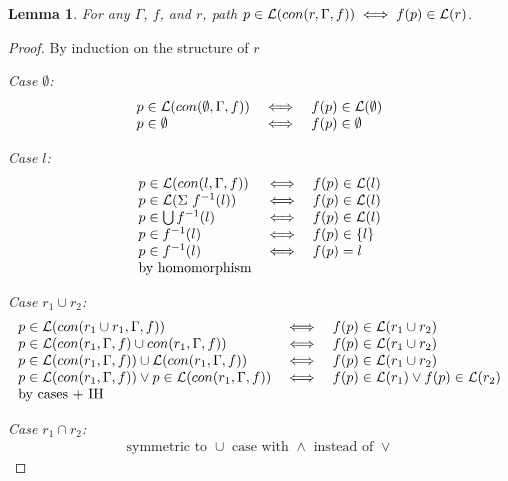 \documentclass[twocolumn, openany]{sig-alternate-10pt}
\newtheorem{lem}[thm]{Lemma}
\begin{document}
\vspace{1em}
\begin{lem}
  For any $\Gamma$, $f$, and $r$, path $p \in \mathcal{L}(con(r,\Gamma,f)) \iff f(p) \in \mathcal{L}(r)$.
\end{lem}
\begin{proof}
By induction on the structure of $r$

\emph{Case $\emptyset$:}
  \[ \begin{array}{lll}
    p \in \mathcal{L}(con(\emptyset,\Gamma,f)) &\iff& f(p) \in \mathcal{L}(\emptyset) \\
    p \in \emptyset &\iff& f(p) \in \emptyset \\
  \end{array} \]

\emph{Case $l$:}
  \[ \begin{array}{lll}
    p \in \mathcal{L}(con(l,\Gamma,f)) &\iff& f(p) \in \mathcal{L}(l) \\
    p \in \mathcal{L}(\Sigma ~ f^{-1}(l)) &\iff& f(p) \in \mathcal{L}(l) \\
    p \in \bigcup f^{-1}(l) &\iff& f(p) \in \mathcal{L}(l) \\
    p \in f^{-1}(l) &\iff& f(p) \in \{ l \} \\
    p \in f^{-1}(l) &\iff& f(p) = l \\
    \text{by homomorphism} & & \\
  \end{array} \]

\emph{Case $r_1 \cup r_2$:}
  \[ \begin{array}{lll}
    p \in \mathcal{L}(con(r_1 \cup r_1,\Gamma,f)) &\iff& f(p) \in \mathcal{L}(r_1 \cup r_2) \\
    p \in \mathcal{L}(con(r_1,\Gamma,f) \cup con(r_1,\Gamma,f)) &\iff& f(p) \in \mathcal{L}(r_1 \cup r_2) \\
    p \in \mathcal{L}(con(r_1,\Gamma,f)) \cup \mathcal{L}(con(r_1,\Gamma,f)) &\iff& f(p) \in \mathcal{L}(r_1 \cup r_2) \\
    p \in \mathcal{L}(con(r_1,\Gamma,f)) \vee p \in \mathcal{L}(con(r_1,\Gamma,f)) 
       &\iff& 
       f(p) \in \mathcal{L}(r_1) \vee f(p) \in \mathcal{L}(r_2) \\
    \text{by cases + IH} & & \\
  \end{array} \]

\emph{Case $r_1 \cap r_2$:} 
  \[ \begin{array}{c}
    \text{symmetric to } \cup \text{ case with } \wedge \text{ instead of } \vee
  \end{array} \]


\end{proof}
\end{document}
